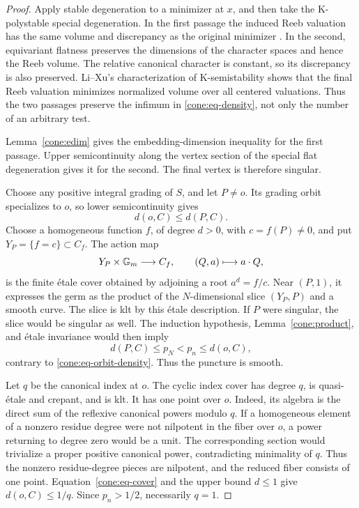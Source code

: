 \begin{proof}
Apply stable degeneration to a minimizer at \(x\), and then take
the K-polystable special degeneration. In the first passage the
induced Reeb valuation has the same volume and discrepancy as the
original minimizer \cite[Lemma~4.10]{LiXu18}.
In the second, equivariant flatness preserves the dimensions of
the character spaces and hence the Reeb volume. The relative
canonical character is constant, so its discrepancy is also
preserved. Li--Xu's characterization of K-semistability
\cite[Theorem~1.3]{LiXu18} shows that the final Reeb valuation
minimizes normalized volume over all centered valuations. Thus the two passages
preserve the infimum in \eqref{cone:eq-density}, not only the
number of an arbitrary test.

Lemma~\ref{cone:edim} gives the embedding-dimension inequality
for the first passage. Upper semicontinuity along the vertex
section of the special flat degeneration gives it for the
second. The final vertex is therefore singular.

Choose any positive integral grading of \(S\), and let \(P\ne o\).
Its grading orbit specializes to \(o\), so lower semicontinuity
gives
\begin{equation}\label{cone:eq-orbit-density}
                         d(o,C)\le d(P,C).
\end{equation}
Choose a homogeneous function \(f\), of degree \(d>0\), with
\(c=f(P)\ne0\), and put \(Y_P=\{f=c\}\subset C_f\).
The action map
\[
 Y_P\times\mathbb G_m\longrightarrow C_f,\qquad (Q,a)\longmapsto a\cdot Q,
\]
is the finite étale cover obtained by adjoining a root
\(a^d=f/c\). Near \((P,1)\), it expresses the germ as the product
of the \(N\)-dimensional slice \((Y_P,P)\) and a smooth curve.
The slice is klt by this étale description.
If \(P\) were singular, the slice would be
singular as well. The induction hypothesis,
Lemma~\ref{cone:product}, and étale invariance would then imply
\[
              d(P,C)\le p_N<p_n\le d(o,C),
\]
contrary to \eqref{cone:eq-orbit-density}. Thus the puncture is
smooth.

Let \(q\) be the canonical index at \(o\). The cyclic index
cover has degree \(q\), is quasi-étale and crepant, and is klt.
It has one point over \(o\). Indeed, its algebra is the direct
sum of the reflexive canonical powers modulo \(q\).
If a homogeneous element of a nonzero residue degree were
not nilpotent in the fiber over \(o\), a power returning to
degree zero would be a unit. The corresponding section would
trivialize a proper positive canonical power, contradicting
minimality of \(q\). Thus the nonzero residue-degree pieces
are nilpotent, and the reduced fiber consists of one point.
Equation~\eqref{cone:eq-cover} and the upper bound \(d\le1\)
give \(d(o,C)\le1/q\). Since \(p_n>1/2\), necessarily \(q=1\).


\end{proof}
